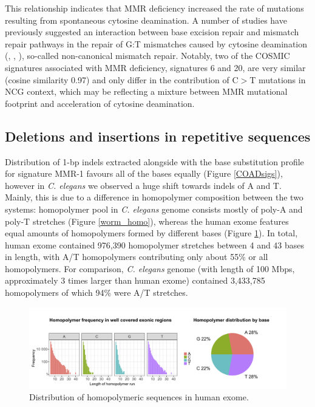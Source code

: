This relationship indicates that MMR deficiency increased the rate of mutations resulting from 
spontaneous cytosine deamination.
A number of studies have previously suggested an interaction between base excision repair 
and mismatch repair pathways in the repair of G:T mismatches caused by cytosine deamination (\cite{Bellacosa2001-uf}, \cite{Tricarico2015-px}, \cite{Grin2016-cw}),
so-called non-canonical mismatch repair. Notably, two of the COSMIC signatures associated with MMR deficiency, 
signatures 6 and 20, are very similar (cosine similarity 0.97) and only differ in the contribution 
of C$>$T mutations in NCG context, which may be reflecting a mixture between MMR mutational footprint
and acceleration of cytosine deamination.


\subsection{Deletions and insertions in repetitive sequences}

Distribution of 1-bp indels extracted alongside with the base substitution profile for signature MMR-1 favours 
all of the bases equally (Figure \ref{COADsigs}), however in \textit{C. elegans} we observed a huge shift 
towards indels of A and T. Mainly, this is due to a difference in homopolymer composition between the two 
systems: homopolymer pool in \textit{C. elegans} genome consists mostly of poly-A and poly-T stretches
(Figure \ref{worm_homo}), whereas the human exome features equal amounts of homopolymers formed by 
different bases (Figure \ref{human_homo}). In total, human exome contained 976,390 homopolymer stretches 
between 4 and 43 bases in length, with A/T homopolymers contributing only about 55\% or all homopolymers. 
For comparison, \textit{C. elegans} genome (with length of 100 Mbps, approximately 3 times larger than human exome) 
contained 3,433,785 homopolymers of which 94\% were A/T stretches.

\begin{figure}[h]
  \centering
  \centerline{\includegraphics[width=1\textwidth]{figures/human_exome.png}}
  \caption{Distribution of homopolymeric sequences in human exome.}
  \label{human_homo}
\end{figure}

